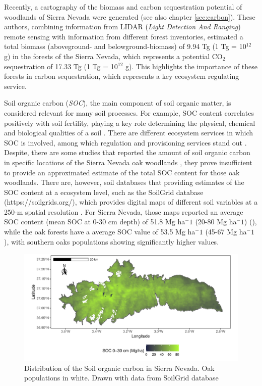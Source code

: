 Recently, a cartography of the biomass and carbon sequestration potential of \Qp woodlands of Sierra Nevada were generated \autocites{PerezLuqueetal2021CarbonSequestration} (see also chapter \ref{sec:carbon}). These authors, combining information from LIDAR (\emph{Light Detection And Ranging}) remote sensing with information from different forest inventories, estimated a total biomass (aboveground- and belowground-biomass) of 9.94 Tg (1 Tg = 10$^12$ g) in the \Qp forests of the Sierra Nevada, which represents a potential CO$_2$ sequestration of 17.33 Tg (1 Tg = 10$^12$ g). This highlights the importance of these forests in carbon sequestration, which represents a key ecosystem regulating service.

Soil organic carbon (\emph{SOC}), the main component of soil organic matter, is considered relevant for many soil processes. For example, SOC content correlates positively with soil fertility, playing a key role determining the physical, chemical and biological qualities of a soil \autocites{Victoriaetal2012BenefitsSoil}. There are different ecosystem services in which SOC is involved, among which regulation and provisioning services stand out \autocites{Francavigliaetal2018OrganicCarbon}. Despite, there are some studies that reported the amount of soil organic carbon in specific locations of the Sierra Nevada oak woodlands \autocites{CoboDiazetal2017TaxonomicFunctional,Lasaetal2019BacteriaEndosphere}, they prove insufficient to provide an approximated estimate of the total SOC content for those oak woodlands. There are, however, soil databases that providing estimates of the SOC content at a ecosystem level, such as the SoilGrid database (https://soilgrids.org/), which provides digital maps of different soil variables at a 250-m spatial resolution \autocites{Hengletal2017SoilGrids250mGlobal,Batjesetal2017WoSISProviding,Batjesetal2020StandardisedSoil}. For Sierra Nevada, those maps reported an average SOC content (mean SOC at 0-30 cm depth) of 51.8 Mg ha$^-1$ (20-80 Mg ha$^-1$) (), while the oak forests have a average SOC value of 53.5 Mg ha$^-1$ (45-67 Mg ha$^-1$), with southern oaks populations showing significantly higher values. 

\begin{figure}
    \centering
    \includegraphics[width=\textwidth]{img/es/es-soc.pdf}\caption{Distribution of the Soil organic carbon in Sierra Nevada. Oak populations in white. Drawn with data from SoilGrid database \autocites[see][]{Hengletal2017SoilGrids250mGlobal}}\label{fig:es:soc}
\end{figure}


